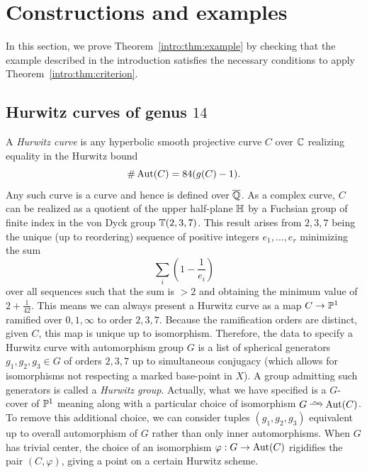 \documentclass[main.tex]{subfiles}
\begin{document}
\section{Constructions and examples} \label{section:examples}

In this section, we prove Theorem~\ref{intro:thm:example} by checking that the example described in the introduction satisfies the necessary conditions to apply Theorem~\ref{intro:thm:criterion}. 

\subsection{Hurwitz curves of genus $14$}

A \textit{Hurwitz curve} is any hyperbolic smooth projective curve $C$ over $\CC$ realizing equality in the Hurwitz bound
\[ \# \Aut(C) = 84(g(C) - 1). \]
Any such curve is a \Belyi curve and hence is defined over $\ol{\Q}$. As a complex curve, $C$ can be realized as a quotient of the upper half-plane $\HH$ by a Fuchsian group of finite index in the von Dyck group $\TT(2,3,7)$. This result arises from $2,3,7$ being the unique (up to reordering) sequence of positive integers $e_1, \dots, e_r$ minimizing the sum 
\[ \sum_i \left( 1 - \frac{1}{e_i} \right) \]
over all sequences such that the sum is $> 2$ and obtaining the minimum value of $2 + \frac{1}{42}$. This means we can always present a Hurwitz curve as a \Belyi map $C \to \P^1$ ramified over $0,1,\infty$ to order $2,3,7$. Because the ramification orders are distinct, given $C$, this map is unique up to isomorphism. Therefore, the data to specify a Hurwitz curve with automorphism group $G$ is a list of spherical generators $g_1, g_2, g_3 \in G$ of orders $2,3,7$ up to simultaneous conjugacy (which allows for isomorphisms not respecting a marked base-point in $X$). A group admitting such generators is called a \textit{Hurwitz group}. Actually, what we have specified is a $G$-\Belyi cover of $\P^1$ meaning along with a particular choice of isomorphism $G \iso \Aut(C)$. To remove this additional choice, we can consider tuples $(g_1, g_2, g_3)$ equivalent up to overall automorphism of $G$ rather than only inner automorphisms.  When $G$ has trivial center, the choice of an isomorphism $\varphi : G \to \Aut(C)$ rigidifies the pair $(C, \varphi)$, giving a point on a certain Hurwitz scheme.
\par 
\end{document}
